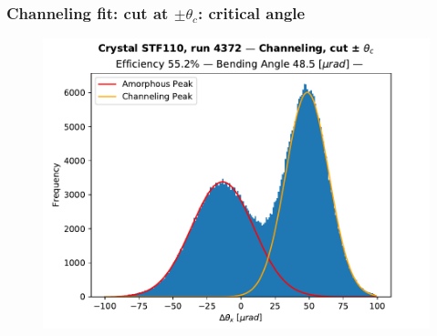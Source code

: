 \documentclass[10pt]{beamer}
\begin{document}
\begin{frame}
\frametitle{Channeling fit: cut at $\pm \theta_c$: critical angle}

\begin{figure}
\includegraphics[width=0.8\linewidth]{thetac_chan_histo.pdf}\\
\end{figure}

\end{frame}
\end{document}
